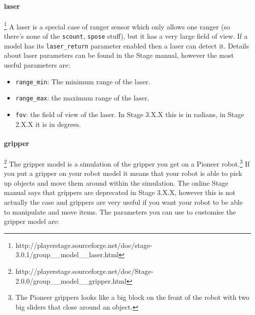 \documentclass[a4paper]{report}
\begin{document}
\paragraph{laser}\footnote{http://playerstage.sourceforge.net/doc/stage-3.0.1/group\_\_model\_\_laser.html}
A laser is a special case of ranger sensor which only allows one ranger (so there's none of the \verb|scount|, \verb|spose| stuff), but it has a very large field of view. If a model has its \verb|laser_return| parameter enabled then a laser can detect it. Details about laser parameters can be found in the Stage manual, however the most useful parameters are:
\begin{itemize}
\item \verb|range_min|: The minimum range of the laser.
\item \verb|range_max|: the maximum range of the laser.
\item \verb|fov|: the field of view of the laser. In Stage 3.X.X this is in radians, in Stage 2.X.X it is in degrees.
\end{itemize}

\paragraph{gripper}\footnote{http://playerstage.sourceforge.net/doc/Stage-2.0.0/group\_\_model\_\_gripper.html}\label{sec:gripper}
The gripper model is a simulation of the gripper you get on a Pioneer robot.\footnote{The Pioneer grippers looks like a big block on the front of the robot with two big sliders that close around an object.} If you put a gripper on your robot model it means that your robot is able to pick up objects and move them around within the simulation. The online Stage manual says that grippers are deprecated in Stage 3.X.X, however this is not actually the case and grippers are very useful if you want your robot to be able to manipulate and move items. The parameters you can use to customise the gripper model are:
\end{document}
